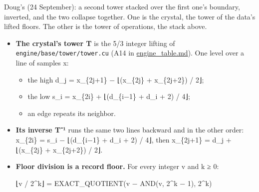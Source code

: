 Doug's (24 September): a second tower stacked over the first one's boundary, inverted, and the two collapse together. One is the crystal, the tower of the data's lifted floors. The other is the tower of operations, the stack above.

\begin{itemize}
\item \textbf{The crystal's tower T} is the 5/3 integer lifting of \texttt{engine/\allowbreak{}base/\allowbreak{}tower/\allowbreak{}tower.\allowbreak{}cu} (A14 in \hyperref[chap:engine-table]{engine\_\allowbreak{}table.md}). One level over a line of samples x:

\begin{itemize}
\item the high d\_\allowbreak{}j = x\_\allowbreak{}\{2j+1\} − ⌊(x\_\allowbreak{}\{2j\} + x\_\allowbreak{}\{2j+2\}) / 2⌋;
\item the low s\_\allowbreak{}i = x\_\allowbreak{}\{2i\} + ⌊(d\_\allowbreak{}\{i−1\} + d\_\allowbreak{}i + 2) / 4⌋;
\item an edge repeats its neighbor.
\end{itemize}
\item \textbf{Its inverse T⁻¹} runs the same two lines backward and in the other order: x\_\allowbreak{}\{2i\} = s\_\allowbreak{}i − ⌊(d\_\allowbreak{}\{i−1\} + d\_\allowbreak{}i + 2) / 4⌋, then x\_\allowbreak{}\{2j+1\} = d\_\allowbreak{}j + ⌊(x\_\allowbreak{}\{2j\} + x\_\allowbreak{}\{2j+2\}) / 2⌋.
\item \textbf{Floor division is a record floor.} For every integer v and k ≥ 0:

⌊v / 2\textasciicircum{}k⌋ = EXACT\_\allowbreak{}QUOTIENT(v − AND(v, 2\textasciicircum{}k − 1), 2\textasciicircum{}k)


\end{itemize}

